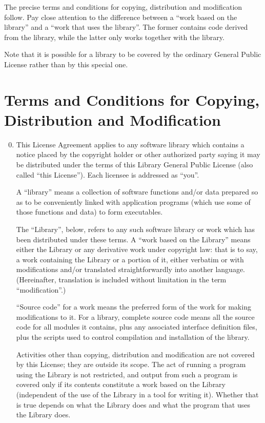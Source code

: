   The precise terms and conditions for copying, distribution and
modification follow.  Pay close attention to the difference between a
``work based on the library'' and a ``work that uses the library''.  The
former contains code derived from the library, while the latter only
works together with the library.

  Note that it is possible for a library to be covered by the ordinary
General Public License rather than by this special one.

\section*{Terms and Conditions for Copying, Distribution and Modification}

\begin{enumerate}
\setcounter{enumi}{-1}
\item This License Agreement applies to any software library which
contains a notice placed by the copyright holder or other authorized
party saying it may be distributed under the terms of this Library
General Public License (also called ``this License'').  Each licensee is
addressed as ``you''.

  A ``library'' means a collection of software functions and/or data
prepared so as to be conveniently linked with application programs
(which use some of those functions and data) to form executables.

  The ``Library'', below, refers to any such software library or work
which has been distributed under these terms.  A ``work based on the
Library'' means either the Library or any derivative work under
copyright law: that is to say, a work containing the Library or a
portion of it, either verbatim or with modifications and/or translated
straightforwardly into another language.  (Hereinafter, translation is
included without limitation in the term ``modification''.)

``Source code'' for a work means the preferred form of the work for
making modifications to it.  For a library, complete source code means
all the source code for all modules it contains, plus any associated
interface definition files, plus the scripts used to control compilation
and installation of the library.

  Activities other than copying, distribution and modification are not
covered by this License; they are outside its scope.  The act of
running a program using the Library is not restricted, and output from
such a program is covered only if its contents constitute a work based
on the Library (independent of the use of the Library in a tool for
writing it).  Whether that is true depends on what the Library does
and what the program that uses the Library does.
  

\end{enumerate}
